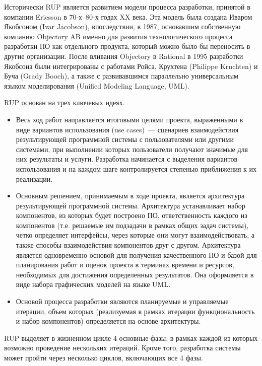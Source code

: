 \documentclass{../../text-style}
\begin{document}
Исторически RUP является развитием модели процесса разработки, принятой в компании Ericsson в 70-х–80-х годах XX века. Эта модель была создана Иваром Якобсоном (Ivar Jacobson), впоследствии, в 1987, основавшим собственную компанию Objectory AB именно для развития технологического процесса разработки ПО как отдельного продукта, который можно было бы переносить в другие организации. После вливания Objectory в Rational в 1995 разработки Якобсона были интегрированы с работами Ройса, Крухтена (Philippe Kruchten) и Буча (Grady Booch), а также с развивавшимся параллельно универсальным языком моделирования (Unified Modeling Language, UML).

RUP основан на трех ключевых идеях.

\begin{itemize}
    \item Весь ход работ направляется итоговыми целями проекта, выраженными в виде вариантов использования (use cases)~--- сценариев взаимодействия результирующей программной системы с пользователями или другими системами, при выполнении которых пользователи получают значимые для них результаты и услуги. Разработка начинается с выделения вариантов использования и на каждом шаге контролируется степенью приближения к их реализации.
    \item Основным решением, принимаемым в ходе проекта, является архитектура результирующей программной системы. Архитектура устанавливает набор компонентов, из которых будет построено ПО, ответственность каждого из компонентов (т.е. решаемые им подзадачи в рамках общих задач системы), четко определяет интерфейсы, через которые они могут взаимодействовать, а также способы взаимодействия компонентов друг с другом. Архитектура является одновременно основой для получения качественного ПО и базой для планирования работ и оценок проекта в терминах времени и ресурсов, необходимых для достижения определенных результатов. Она оформляется в виде набора графических моделей на языке UML.
    \item Основой процесса разработки являются планируемые и управляемые итерации, объем которых (реализуемая в рамках итерации функциональность и набор компонентов) определяется на основе архитектуры.
\end{itemize}

RUP выделяет в жизненном цикле 4 основные фазы, в рамках каждой из которых возможно проведение нескольких итераций. Кроме того, разработка системы может пройти через несколько циклов, включающих все 4 фазы.
\end{document}
